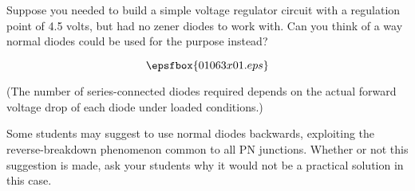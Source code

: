 

Suppose you needed to build a simple voltage regulator circuit with a regulation point of 4.5 volts, but had no zener diodes to work with.  Can you think of a way normal diodes could be used for the purpose instead?







$$\epsfbox{01063x01.eps}$$

\vskip 10pt

(The number of series-connected diodes required depends on the actual forward voltage drop of each diode under loaded conditions.)







Some students may suggest to use normal diodes backwards, exploiting the reverse-breakdown phenomenon common to all PN junctions.  Whether or not this suggestion is made, ask your students why it would not be a practical solution in this case.




